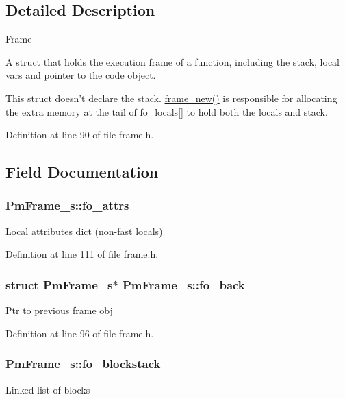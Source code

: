 \subsection{Detailed Description}
Frame

A struct that holds the execution frame of a function, including the stack, local vars and pointer to the code object.

This struct doesn't declare the stack. \hyperlink{frame_8c_ab2ab765d372a18353af06acfb54e5ad7}{frame\-\_\-new()} is responsible for allocating the extra memory at the tail of fo\-\_\-locals\mbox{[}\mbox{]} to hold both the locals and stack. 

Definition at line 90 of file frame.\-h.



\subsection{Field Documentation}
\hypertarget{struct_pm_frame__s_ac31f338509fd3301afdb42bcc6c2517e}{
\subsubsection[{fo\-\_\-attrs}]{ Pm\-Frame\-\_\-s\-::fo\-\_\-attrs}}\label{struct_pm_frame__s_ac31f338509fd3301afdb42bcc6c2517e}
Local attributes dict (non-\/fast locals) 

Definition at line 111 of file frame.\-h.

\hypertarget{struct_pm_frame__s_ab9973b6a1a9107539de3ffa4b181a3ff}{
\subsubsection[{fo\-\_\-back}]{\setlength{\rightskip}{0pt plus 5cm}struct {\bf Pm\-Frame\-\_\-s}$\ast$ Pm\-Frame\-\_\-s\-::fo\-\_\-back}}\label{struct_pm_frame__s_ab9973b6a1a9107539de3ffa4b181a3ff}
Ptr to previous frame obj 

Definition at line 96 of file frame.\-h.

\hypertarget{struct_pm_frame__s_aff746256e6c9b88ca389f5e61468501b}{
\subsubsection[{fo\-\_\-blockstack}]{ Pm\-Frame\-\_\-s\-::fo\-\_\-blockstack}}\label{struct_pm_frame__s_aff746256e6c9b88ca389f5e61468501b}
Linked list of blocks 

